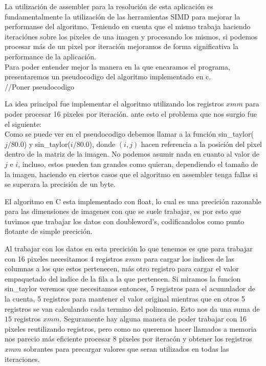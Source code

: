 La utilización de assembler para la resolución de esta aplicación es fundamentalmente la utilización de las herramientas SIMD para mejorar la performanse del algoritmo. Teniendo en cuenta que el mismo trabaja haciendo iteraciónes sobre los pixeles de una imagen y procesando los mismos, si podemos procesar más de un pixel por iteración mejoramos de forma significativa la performance de la aplicación.\\

Para poder entender mejor la manera en la que encaramos el programa, presentaremos un pseudocodigo del algoritmo implementado en c.\\

//Poner pseudocodigo

La idea principal fue implementar el algoritmo utilizando los registros $xmm$ para poder procesar 16 pixeles por iteración. ante esto el problema que nos surgio fue el siguiente:\\

Como se puede ver en el pseudocodigo debemos llamar a la función sin_taylor($j/80.0$) y sin_taylor($i/80.0$), donde $(i,j)$ hacen referencia a la posición del pixel dentro de la matriz de la imagen. No podemos asumir nada en cuanto al valor de $j$ e $i$, incluso, estos pueden tan grandes como quieran, dependiendo el tamaño de la imagen, haciendo en ciertos casos que el algoritmo en assembler tenga fallas si se superara la precisión de un byte. 

El algoritmo en C esta implementado con float, lo cual es una precición razonable para las dimensiones de imagenes con que se suele trabajar, es por esto que tuvimos que trabajar los datos con doubleword's, codificandolos como punto flotante de simple precición.

Al trabajar con los datos en esta precición lo que tenemos es que para trabajar con 16 pixeles necesitamos 4 registros $xmm$ para cargar los indices de las columnas a los que estos pertenecen, más otro registro para cargar el valor empaquetado del indice de la fila a la que pertencen. Si miramos la funcion sin_taylor veremos que necesitamos entonces, 5 registros para el acumulador de la cuenta, 5 registros para mantener el valor original mientras que en otros 5 registros se van calculando cada termino del polinomio. Esto nos da una suma de $15$ registros $xmm$. Seguramente hay alguna manera de poder trabajar con 16 pixeles reutilizando registros, pero como no queremos hacer llamados a memoria nos parecio más eficiente procesar 8 pixeles por iteracón y obtener los registros $xmm$ sobrantes para precargar valores que seran utilizados en todas las iteraciones. \\

